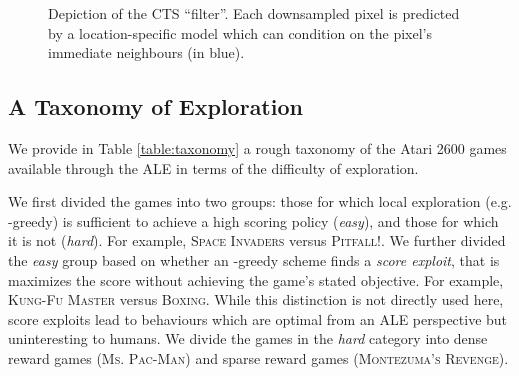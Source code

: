 \documentclass{article}
\newcommand{\gamename}[1]{\textsc{#1}}
\begin{document}
{\begin{figure*}
\caption{Depiction of the CTS ``filter''. Each downsampled pixel is predicted by a location-specific model which can condition on the pixel's immediate neighbours (in blue).\label{fig:filter}}
\end{figure*}

\subsection{A Taxonomy of Exploration}

We provide in Table \ref{table:taxonomy} a rough taxonomy of the Atari 2600 games available through the ALE in terms of the difficulty of exploration.

We first divided the games into two groups: those for which local exploration (e.g. -greedy) is sufficient to achieve a high scoring policy (\emph{easy}), and those for which it is not (\emph{hard}). For example, \gamename{Space Invaders} versus \gamename{Pitfall!}. We further divided the \emph{easy} group based on whether an -greedy scheme finds a \emph{score exploit}, that is maximizes the score without achieving the game's stated objective. For example, \gamename{Kung-Fu Master} versus \gamename{Boxing}. While this distinction is not directly used here, score exploits lead to behaviours which are optimal from an ALE perspective but uninteresting to humans. We divide the games in the \emph{hard} category into dense reward games (\gamename{Ms. Pac-Man}) and sparse reward games (\gamename{Montezuma's Revenge}).

}
\end{document}
